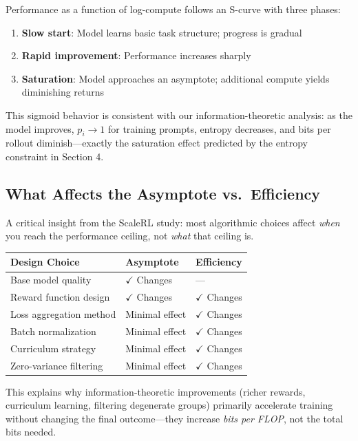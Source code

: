 \documentclass[11pt,a4paper]{article}
\theoremstyle{definition}
\theoremstyle{remark}
\begin{document}
Performance as a function of log-compute follows an S-curve with three phases:
\begin{enumerate}
    \item \textbf{Slow start}: Model learns basic task structure; progress is gradual
    \item \textbf{Rapid improvement}: Performance increases sharply
    \item \textbf{Saturation}: Model approaches an asymptote; additional compute yields diminishing returns
\end{enumerate}

This sigmoid behavior is consistent with our information-theoretic analysis: as the model improves, $p_i \to 1$ for training prompts, entropy decreases, and bits per rollout diminish---exactly the saturation effect predicted by the entropy constraint in Section 4.

\subsection{What Affects the Asymptote vs.\ Efficiency}

A critical insight from the ScaleRL study: most algorithmic choices affect \emph{when} you reach the performance ceiling, not \emph{what} that ceiling is.

\begin{center}
\begin{tabular}{@{}p{5cm}p{3cm}p{3cm}@{}}
\toprule
\textbf{Design Choice} & \textbf{Asymptote} & \textbf{Efficiency} \\
\midrule
Base model quality & $\checkmark$ Changes & --- \\
Reward function design & $\checkmark$ Changes & $\checkmark$ Changes \\
Loss aggregation method & Minimal effect & $\checkmark$ Changes \\
Batch normalization & Minimal effect & $\checkmark$ Changes \\
Curriculum strategy & Minimal effect & $\checkmark$ Changes \\
Zero-variance filtering & Minimal effect & $\checkmark$ Changes \\
\bottomrule
\end{tabular}
\end{center}

This explains why information-theoretic improvements (richer rewards, curriculum learning, filtering degenerate groups) primarily accelerate training without changing the final outcome---they increase \emph{bits per FLOP}, not the total bits needed.
\end{document}
